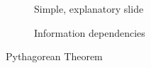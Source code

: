 \documentclass[twoside, 12pt]{article}
\begin{document}
\begin{figure}[H]
        \centering
        \begin{subfigure}[b]{0.47\textwidth}
			   \caption{Simple, explanatory slide}
                \label{fig:Annie-presentation-teacher}
        \end{subfigure}%
        \qquad %
        \begin{subfigure}[b]{0.47\textwidth}
		  \caption{Information dependencies}
                \label{fig:Annie-presentation-information}
        \end{subfigure}
        \caption{Pythagorean Theorem}\label{fig:PythagoreanTheorem}
\end{figure}
\end{document}
